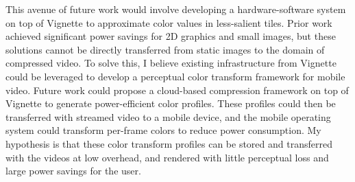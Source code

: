 This avenue of future work would involve developing a hardware-software system on top of Vignette to approximate color values in less-salient tiles.
Prior work achieved significant power savings for 2D graphics and small images, but these solutions cannot be directly transferred from static images to the domain of compressed video.
To solve this, I believe existing infrastructure from Vignette could be leveraged to develop a perceptual color transform framework for mobile video.
Future work could propose a cloud-based compression framework on top of Vignette to generate power-efficient color profiles.
These profiles could then be transferred with streamed video to a mobile device, and the mobile operating system could transform per-frame colors to reduce power consumption.
My hypothesis is that these color transform profiles can be stored and transferred with the videos at low overhead, and rendered with little perceptual loss and large power savings for the user.
